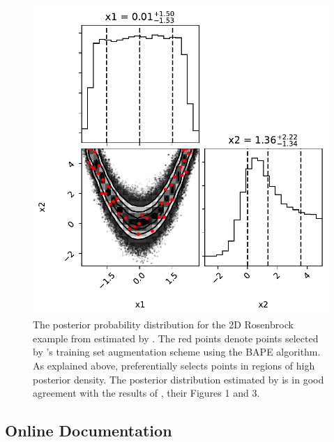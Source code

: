 \begin{figure}
\centering
	\includegraphics[width=\textwidth]{finalPosterior.pdf}
   \caption{The posterior probability distribution for the 2D Rosenbrock example from \citet{Wang2018} estimated by \approxposterior.  The red points denote points selected by \approxposterior's training set augmentation scheme using the BAPE algorithm. As explained above, \approxposterior preferentially selects points in regions of high posterior density. The posterior distribution estimated by \approxposterior is in good agreement with the results of \citet{Wang2018}, their Figures 1 and 3.}%
    \label{AP:fig:rosenbrock}%
\end{figure}

\subsection{Online Documentation} \label{AP:sec:docs}

